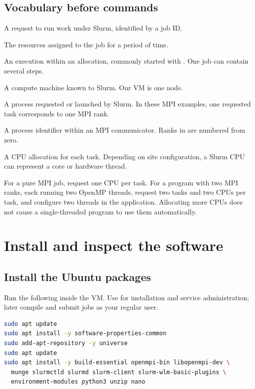 \documentclass[11pt,a4paper]{article}
\newcommand{\cmd}[1]{\texttt{\detokenize{#1}}}
\begin{document}
\subsection{Vocabulary before commands}
\begin{description}[style=nextline,leftmargin=0pt,labelwidth=0pt,labelsep=0pt]
\item[Job] A request to run work under Slurm, identified by a job ID.
\item[Allocation] The resources assigned to the job for a period of time.
\item[Job step] An execution within an allocation, commonly started with
\cmd{srun}. One job can contain several steps.
\item[Node] A compute machine known to Slurm. Our VM is one node.
\item[Task] A process requested or launched by Slurm. In these MPI examples,
one requested task corresponds to one MPI rank.
\item[Rank] A process identifier within an MPI communicator. Ranks in
\cmd{MPI_COMM_WORLD} are numbered from zero.
\item[CPU per task] A CPU allocation for each task. Depending on site
configuration, a Slurm CPU can represent a core or hardware thread.
\end{description}

For a pure MPI job, request one CPU per task. For a program with two MPI
ranks, each running two OpenMP threads, request two tasks and two CPUs per
task, and configure two threads in the application. Allocating more CPUs
does not cause a single-threaded program to use them automatically.

\section{Install and inspect the software}
\subsection{Install the Ubuntu packages}
Run the following inside the VM. Use \cmd{sudo} for installation and service
administration; later compile and submit jobs as your regular user.
\par\nobreak
\begin{minipage}{\linewidth}
\begin{lstlisting}[language=bash]
sudo apt update
sudo apt install -y software-properties-common
sudo add-apt-repository -y universe
sudo apt update
sudo apt install -y build-essential openmpi-bin libopenmpi-dev \
  munge slurmctld slurmd slurm-client slurm-wlm-basic-plugins \
  environment-modules python3 unzip nano
\end{lstlisting}
\end{minipage}\par
\end{document}
